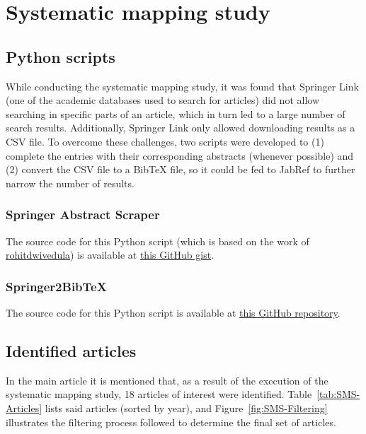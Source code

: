 \documentclass[12pt]{article}
\begin{document}
	\section{Systematic mapping study}
	
	\subsection{Python scripts}
	While conducting the systematic mapping study, it was found that Springer Link (one of the academic databases used to search for articles) did not allow searching in specific parts of an article, which in turn led to a large number of search results. Additionally, Springer Link only allowed downloading results as a CSV file. To overcome these challenges, two scripts were developed to (1) complete the entries with their corresponding abstracts (whenever possible) and (2) convert the CSV file to a BibTeX file, so it could be fed to JabRef to further narrow the number of results.
	
	\subsubsection{Springer Abstract Scraper}
	The source code for this Python script (which is based on the work of \href{https://github.com/rohitdwivedula}{rohitdwivedula}) is available at \href{https://gist.github.com/arielmachini/f6f299c69230e258f4e49ab9814b3087}{this GitHub gist}.
	
	\subsubsection{Springer2BibTeX}
	The source code for this Python script is available at \href{https://github.com/arielmachini/Springer2BibTeX}{this GitHub repository}.
	
	\subsection{Identified articles}
	In the main article it is mentioned that, as a result of the execution of the systematic mapping study, 18 articles of interest were identified. Table~\ref{tab:SMS-Articles} lists said articles (sorted by year), and Figure~\ref{fig:SMS-Filtering} illustrates the filtering process followed to determine the final set of articles.
	
\end{document}

